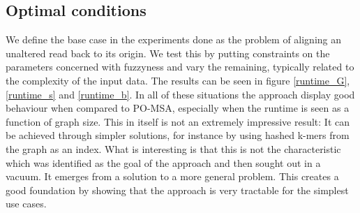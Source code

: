 \documentclass[thesis.tex]{subfiles}
\begin{document}
\subsection*{Optimal conditions}
We define the base case in the experiments done as the problem of aligning an unaltered read back to its origin. We test this by putting constraints on the parameters concerned with fuzzyness and vary the remaining, typically related to the complexity of the input data. The results can be seen in figure \ref{runtime_G}, \ref{runtime_s} and \ref{runtime_b}. In all of these situations the approach display good behaviour when compared to PO-MSA, especially when the runtime is seen as a function of graph size. This in itself is not an extremely impressive result: It can be achieved through simpler solutions, for instance by using hashed k-mers from the graph as an index. What is interesting is that this is not the characteristic which was identified as the goal of the approach and then sought out in a vacuum. It emerges from a solution to a more general problem. This creates a good foundation by showing that the approach is very tractable for the simplest use cases.
\end{document}
